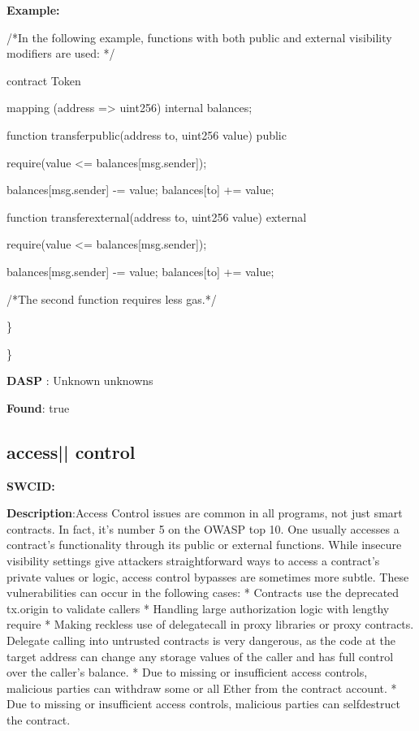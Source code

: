 \documentclass{article}
\begin{document}
\textbf{Example:} 
\begin{ffcode} 

 /*In the following example, functions with both public and external visibility modifiers are used: */ 

contract Token {

    mapping (address => uint256) internal \textunderscore balances;

    function transfer\textunderscore public(address to, uint256 value) public {
        require(value <= \textunderscore balances[msg.sender]);

        \textunderscore balances[msg.sender] -= value;
        \textunderscore balances[to] += value;
    }

    function transfer\textunderscore external(address to, uint256 value) external {
        require(value <= \textunderscore balances[msg.sender]);

        \textunderscore balances[msg.sender] -= value;
        \textunderscore balances[to] += value;
    }
}

 /*The second function requires less gas.*/ 

\end{ffcode} 
\} 

\} 

\textbf{DASP} : Unknown unknowns

\textbf{Found}: true

\subsection{access{|\textunderscore| }control} 
\textbf{SWC{\textunderscore }ID:} 

\textbf{Description}:Access Control issues are common in all programs, not just smart contracts. In fact, it's number 5 on the OWASP top 10. One usually accesses a contract's functionality through its public or external functions. While insecure visibility settings give attackers straightforward ways to access a contract's private values or logic, access control bypasses are sometimes more subtle. These vulnerabilities can occur in the following cases:
* Contracts use the deprecated tx.origin to validate callers
* Handling large authorization logic with lengthy require
* Making reckless use of delegatecall in proxy libraries or proxy contracts. Delegate calling into untrusted contracts is very dangerous, as the code at the target address can change any storage values of the caller and has full control over the caller's balance.
* Due to missing or insufficient access controls, malicious parties can withdraw some or all Ether from the contract account.
* Due to missing or insufficient access controls, malicious parties can self{\textendash}destruct the contract.
\end{document}
